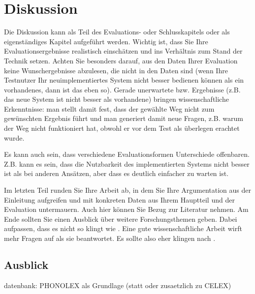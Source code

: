 
\chapter{Diskussion}
Die Diskussion kann als Teil des Evaluations- oder Schlusskapitels oder als eigenständiges Kapitel aufgeführt werden. Wichtig ist, dass Sie Ihre Evaluationsergebnisse realistisch einschätzen und ins Verhältnis zum Stand der Technik setzen. Achten Sie besonders darauf, aus den Daten Ihrer Evaluation keine Wunschergebnisse abzulesen, die nicht in den Daten sind (wenn Ihre Testnutzer Ihr neuimplementiertes System nicht besser bedienen können als ein vorhandenes, dann ist das eben so). Gerade unerwartete bzw.  Ergebnisse (z.B. das neue System ist nicht besser als vorhandene) bringen wissenschaftliche Erkenntnisse: man stellt damit fest, dass der gewählte Weg nicht zum gewünschten Ergebnis führt und man generiert damit neue Fragen, z.B. warum der Weg nicht funktioniert hat, obwohl er vor dem Test als überlegen erachtet wurde.

Es kann auch sein, dass verschiedene Evaluationsformen Unterschiede offenbaren. Z.B. kann es sein, dass die Nutzbarkeit des implementierten Systems nicht besser ist als bei anderen Ansätzen, aber dass es deutlich einfacher zu warten ist.


Im letzten Teil runden Sie Ihre Arbeit ab, in dem Sie Ihre Argumentation aus der Einleitung aufgreifen und mit konkreten Daten aus Ihrem Hauptteil und der Evaluation untermauern. Auch hier können Sie Bezug zur Literatur nehmen. Am Ende sollten Sie einen Ausblick über weitere Forschungsthemen geben. Dabei aufpassen, dass es nicht so klingt wie . Eine gute wissenschaftliche Arbeit wirft mehr Fragen auf als sie beantwortet. Es sollte also eher klingen nach .

\section{Ausblick}

datenbank: PHONOLEX als Grundlage (statt oder zusaetzlich zu CELEX)
